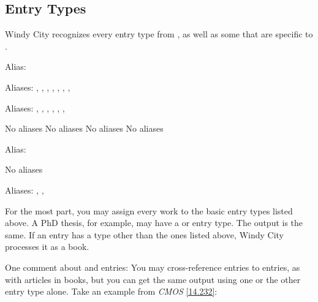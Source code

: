 \documentclass[11pt,letterpaper,oneside]{article}
\begin{document}
\subsection{Entry Types}
\label{entrytypes}

Windy City recognizes every entry type from \BibTeX, as well as some
that are specific to \biblatex.

\begin{typelist}
\RaggedRight


Alias: 


Aliases: , , ,
, , ,
, 


Aliases: , ,
, , ,
, 

 No aliases
 No aliases
 No aliases
 No aliases


Alias: 

 No aliases


Aliases: , ,

\end{typelist}

\noindent For the most part, you may assign every work to the basic
entry types listed above. A PhD thesis, for example, may have a
 or  entry type. The output is the
same. If an entry has a type other than the ones listed above, Windy
City processes it as a book.

One comment about  and 
entries: You may cross-reference  entries to
 entries, as with articles in books, but you can
get the same output using one or the other entry type alone. Take an
example from \textit{CMOS} \ref{14.232}:

\begin{citeonly}
\item \cite{salvation1980}
\end{citeonly}
\end{document}
